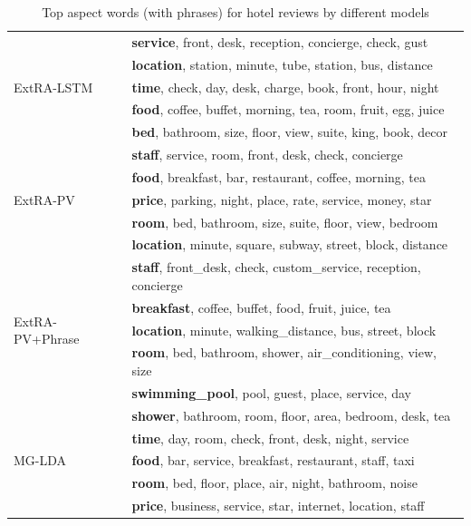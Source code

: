 \begin{table}[th]
	
\centering
\caption{Top aspect words (with phrases) for hotel reviews by different models}
\label{table:hotel_aspect_words}
\begin{tabular}{|l|l|} \hline
\multirow{5}{30px}{ExtRA-LSTM}
& \textbf{service}, front, desk, reception, concierge, check, gust \\
& \textbf{location}, station, minute, tube, station, bus, distance \\
& \textbf{time}, check, day, desk, charge, book, front, hour, night \\
& \textbf{food}, coffee, buffet, morning, tea, room, fruit, egg, juice \\
& \textbf{bed}, bathroom, size, floor, view, suite, king, book, decor \\ \hline

\multirow{5}{30px}{ExtRA-PV}
& \textbf {staff}, service, room, front, desk, check, concierge \\
& \textbf {food}, breakfast, bar, restaurant, coffee, morning, tea \\
& \textbf {price}, parking, night, place, rate, service, money, star \\
& \textbf {room}, bed, bathroom, size, suite, floor, view, bedroom \\
& \textbf {location}, minute, square, subway, street, block, distance \\\hline

\multirow{5}{31px}{ExtRA-PV+Phrase}
&  \textbf{staff}, front\_desk, check, custom\_service, reception, concierge \\
&  \textbf{breakfast}, coffee, buffet, food, fruit, juice, tea \\
&  \textbf{location}, minute, walking\_distance, bus, street, block \\
&  \textbf{room}, bed, bathroom, shower, air\_conditioning, view, size \\
&  \textbf{swimming\_pool}, pool, guest, place, service, day \\\hline

\multirow{5}{30px}{MG-LDA}
& \textbf{shower}, bathroom, room, floor, area, bedroom, desk, tea \\
& \textbf{time}, day, room, check, front, desk, night, service \\
& \textbf{food}, bar, service, breakfast, restaurant, staff, taxi \\
& \textbf{room}, bed, floor, place, air, night, bathroom, noise \\
& \textbf{price}, business, service, star, internet, location, staff \\\hline


\end{tabular}
\end{table}
